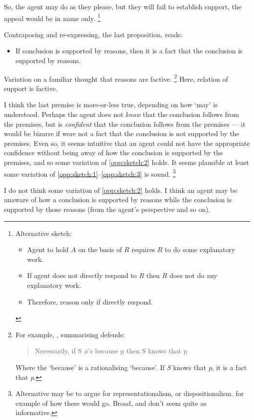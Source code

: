 \documentclass[10pt]{article}
\begin{document}
So, the agent may do as they please, but they will fail to establish support, the appeal would be in name only.\nolinebreak
\footnote{
  Alternative sketch:
  \begin{itemize}
  \item Agent to hold \(A\) on the basis of \(R\) requires \(R\) to do some explanatory work.
  \item If agent does not directly respond to \(R\) then \(R\) does not do any explanatory work.
  \item Therefore, reason only if directly respond.
  \end{itemize}
}

Contraposing and re-expressing, the last proposition, reads:

\begin{itemize}
\item If conclusion is supported by reasons, then it is a fact that the conclusion is supported by reasons.
\end{itemize}

Variation on a familiar thought that reasons are factive.\nolinebreak
\footnote{
  For example, \textcite[673]{Cunningham:2020aa}, summarising \textcite{Hornsby:2007aa,Hornsby:2007ab,Hornsby:2008aa} defends:
  \begin{quote}
    Necessarily, if S \(\phi\)'s because p then S knows that p
  \end{quote}
  Where the `because' is a rationalising `because'.
  If \emph{S} knows that \emph{p}, it is a fact that \emph{p}.
}
Here, relation of support is factive.

I think the last premise is more-or-less true, depending on how `may' is understood.
Perhaps the agent does not \emph{know} that the conclusion follows from the premises, but is \emph{confident} that the conclusion follows from the premises --- it would be bizarre if were not a fact that the conclusion is not supported by the premises.
Even so, it seems intuitive that an agent could not have the appropriate confidence without being away of how the conclusion is supported by the premises, and so some variation of \ref{opp:sketch:2} holds.
It seems plausible at least some variation of \ref{opp:sketch:1}--\ref{opp:sketch:3} is sound.\nolinebreak
\footnote{
  Alternative may be to argue for representationalism, or dispositionalism.
  \citeauthor{Neta:2019aa} for example of how these would go.
  Broad, and don't seem quite as informative.
}

I do not think some variation of \ref{opp:sketch:2} holds.
I think an agent may be unaware of how a conclusion is supported by reasons while the conclusion is supported by those reasons (from the agent's perspective and so on).
\end{document}
